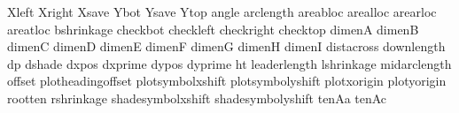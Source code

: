 \newdimen\!Xleft                %
\newdimen\!Xright               %
\newdimen\!Xsave                %
\newdimen\!Ybot                 %
\newdimen\!Ysave                %
\newdimen\!Ytop                 %
\newdimen\!angle                %
\newdimen\!arclength            %
\newdimen\!areabloc             %
\newdimen\!arealloc             %
\newdimen\!arearloc             %
\newdimen\!areatloc             %
\newdimen\!bshrinkage           %
\newdimen\!checkbot             %
\newdimen\!checkleft            %
\newdimen\!checkright           %
\newdimen\!checktop             %
\newdimen\!dimenA               %
\newdimen\!dimenB               %
\newdimen\!dimenC               %
\newdimen\!dimenD               %
\newdimen\!dimenE               %
\newdimen\!dimenF               %
\newdimen\!dimenG               %
\newdimen\!dimenH               %
\newdimen\!dimenI               %
\newdimen\!distacross           %
\newdimen\!downlength           %
\newdimen\!dp                   %
\newdimen\!dshade               %
\newdimen\!dxpos                %
\newdimen\!dxprime              %
\newdimen\!dypos                %
\newdimen\!dyprime              %
\newdimen\!ht                   %
\newdimen\!leaderlength         %
\newdimen\!lshrinkage           %
\newdimen\!midarclength         %
\newdimen\!offset               %
\newdimen\!plotheadingoffset    %
\newdimen\!plotsymbolxshift     %
\newdimen\!plotsymbolyshift     %
\newdimen\!plotxorigin          %
\newdimen\!plotyorigin          %
\newdimen\!rootten              %
\newdimen\!rshrinkage           %
\newdimen\!shadesymbolxshift    %
\newdimen\!shadesymbolyshift    %
\newdimen\!tenAa                %
\newdimen\!tenAc                %

